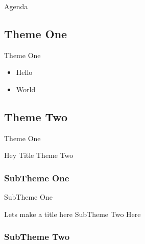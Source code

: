 \documentclass{beamer}
\begin{document}
\begin{frame}{Agenda}
  \linespread{1.5}
  \tableofcontents
\end{frame}

\subsection[]{Theme One}

\begin{frame}{Theme One}
    \begin{itemize}
        \item Hello
        \item World
    \end{itemize}
\end{frame}

\subsection[]{Theme Two}

\begin{frame}{Theme One}
    \begin{exampleblock}{Hey Title}
        Theme Two
    \end{exampleblock}
\end{frame}

\subsubsection{SubTheme One}

\begin{frame}{SubTheme One}
    \vfill
    \begin{block}{Lets make a title here} 
        SubTheme Two Here
    \end{block}
\end{frame}

\subsubsection{SubTheme Two}
\end{document}
